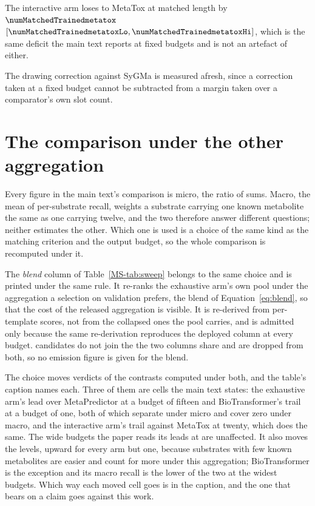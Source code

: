 \documentclass[journal=jcisd8,manuscript=suppinfo,layout=onecolumn]{achemso}
\begin{document}
The interactive arm loses to MetaTox at matched length by
$\numMatchedTrainedmetatox$
$[\numMatchedTrainedmetatoxLo, \numMatchedTrainedmetatoxHi]$, which is the same deficit the main
text reports at fixed budgets and is not an artefact of either.


The drawing correction against SyGMa is measured afresh, since a correction taken
at a fixed budget cannot be subtracted from a margin taken over a comparator's own slot count.
\section{The comparison under the other aggregation}
\label{sec:si-macro}

Every figure in the main text's comparison is micro, the ratio of sums. Macro, the mean of
per-substrate recall, weights a substrate carrying one known metabolite the same as one
carrying twelve, and the two therefore answer different questions; neither estimates the
other. Which one is used is a choice of the same kind as the matching criterion and the output
budget, so the whole comparison is recomputed under it.



The \emph{blend} column of Table~\ref{MS-tab:sweep} belongs to the same choice and is printed
under the same rule. It re-ranks the exhaustive arm's own pool under the aggregation a selection on
validation prefers, the blend of Equation~\ref{eq:blend}, so that the cost of the released
aggregation is visible. It is re-derived from per-template scores, not
from the collapsed ones the pool carries, and is admitted only because the same re-derivation
reproduces the deployed column at every budget. \numAggregationUnjoined{} candidates do not join
the \numAggregationJoined{} the two columns share and are dropped from both, so no emission
figure is given for the blend.

The choice moves \numAggregationMovedWord{} verdicts of the \numAggregationContrasts{}
contrasts computed under both, and the table's caption names each. Three of them are cells the main
text states: the exhaustive
arm's lead over MetaPredictor at a budget of fifteen and BioTransformer's trail at a budget of
one, both of which separate under micro and cover zero under macro, and the interactive arm's trail
against MetaTox at twenty, which does the same. The wide budgets the paper reads its leads at
are unaffected. It also moves the levels, upward for every arm but one,
because substrates with few known metabolites are easier and count for more under this aggregation;
BioTransformer is the exception and its macro recall is the lower of the two at the widest
budgets. Which way each moved cell goes is in the caption, and the one that bears on a claim goes
against
this work.
\end{document}

